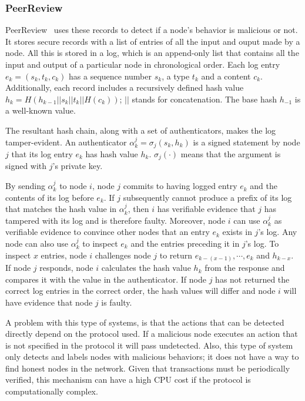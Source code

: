 \subsubsection{PeerReview}
\label{sec:peerreview}
PeerReview~\cite{haeberlen2007peerreview} uses these records 
to detect if a node's behavior is malicious or not. It stores secure records with
a list of entries of all the input and ouput made by a node. All this is stored in
a log, which is an append-only list that contains all the input and output of a
particular node in chronological order. Each log entry $e_k = (s_k, t_k,
c_k)$ has a sequence number $s_k$, a type $t_k$ and a content $c_k$.
Additionally, each record includes a recursively defined hash value $h_k =
H(h_{k-1} || s_k|| t_k || H(c_k))$; $||$ stands for concatenation. The base
hash $h_{-1}$ is a well-known value.


The resultant hash chain, along with a set of authenticators, makes the log tamper-evident. An authenticator
$\alpha^j_k= \sigma_j(s_k , h_k )$ is a signed statement by node $j$ that its log
entry $e_k$ has hash value $h_k$. $\sigma_j (\cdot)$ means that the argument is
signed with $j$'s private key.

By sending $\alpha^j_k$ to node $i$, node $j$ commits to having
 logged entry $e_k$ and the contents of its log before $e_k$. If $j$
 subsequently cannot produce a prefix of its log that matches
 the hash value in $\alpha^j_k$, then $i$ has verifiable evidence that $j$
has tampered with its log and is therefore faulty.
Moreover, node $i$ can use $\alpha^j_k$ as verifiable evidence to convince
 other nodes that an entry $e_k$ exists in $j$'s log. Any node
 can also use $\alpha^j_k$ to inspect $e_k$ and the entries preceding it
 in $j$'s log. To inspect $x$ entries, node $i$ challenges node $j$ to return
 $e_{k - (x-1)}, \cdots , e_k$ and $h_{k - x}$. If node $j$ responds, node $i$ calculates the
hash value $h_k$ from the response and compares it with the
 value in the authenticator. If node $j$ has not returned the correct
 log entries in the correct order, the hash values will differ and node $i$
will have evidence that node $j$ is faulty. 
 

A problem with this type of systems, is that the actions that can be detected
directly depend on the protocol used. If a malicious node executes an action
that is not specified in the protocol it will pass undetected. Also, this type
of system only detects and labels nodes with malicious behaviors; it does not
have a way to find honest nodes in the network.
Given that transactions must be periodically verified, this mechanism can have a high
CPU cost if the protocol is computationally complex.
 

